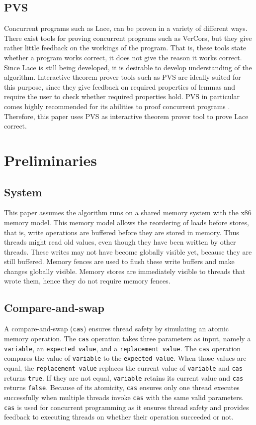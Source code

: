 \documentclass{sig-alternate-br}
\begin{document}
\subsection{PVS}
Concurrent programs such as Lace, can be proven in a variety of different ways.
There exist tools for proving concurrent programs such as VerCors\cite{eemcs24905}, but they give rather little feedback on the workings of the program.
That is, these tools state whether a program works correct, it does not give the reason it works correct.
Since Lace is still being developed, it is desirable to develop understanding of the algorithm.
Interactive theorem prover tools such as PVS are ideally suited for this purpose, since they give feedback on required properties of lemmas and require the user to check whether required properties hold.
PVS in particular comes highly recommended for its abilities to proof concurrent programs\cite{colvin2006formal} \cite{shankar1993verification}.
Therefore, this paper uses PVS as interactive theorem prover tool to prove Lace correct.

\section{Preliminaries}
\subsection{System}
This paper assumes the algorithm runs on a shared memory system with the x86 memory model.
This memory model allows the reordering of loads before stores, that is, write operations are buffered before they are stored in memory.
Thus threads might read old values, even though they have been written by other threads.
These writes may not have become globally visible yet, because they are still buffered.
Memory fences are used to flush these write buffers and make changes globally visible.
Memory stores are immediately visible to threads that wrote them, hence they do not require memory fences.

\subsection{Compare-and-swap}
A compare-and-swap (\texttt{cas}) ensures thread safety by simulating an atomic memory operation.
The \texttt{cas} operation takes three parameters as input, namely a \texttt{variable}, an \texttt{expected value}, and a \texttt{replacement value}.
The \texttt{cas} operation compares the value of \texttt{variable} to the \texttt{expected value}. When those values are equal, the \texttt{replacement value} replaces the current value of \texttt{variable} and \texttt{cas} returns \texttt{true}.
If they are not equal, \texttt{variable} retains its current value and \texttt{cas} returns \texttt{false}.
Because of its atomicity, \texttt{cas} ensures only one thread executes successfully when multiple threads invoke \texttt{cas} with the same valid parameters.
\texttt{cas} is used for concurrent programming as it ensures thread safety and provides feedback to executing threads on whether their operation succeeded or not.
\end{document}
